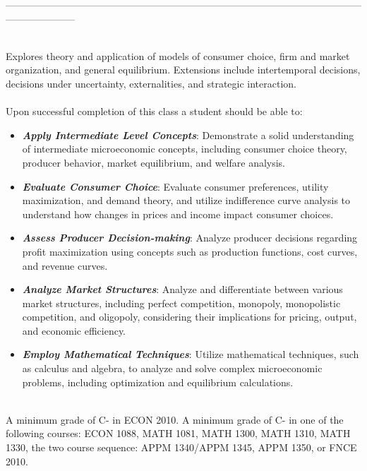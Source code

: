 \documentclass[11pt]{article}
\begin{document}
---------------------------------------------------------------------------------------------------------------------------------

\\
Explores theory and application of models of consumer choice, firm and market organization, and general equilibrium.  Extensions include intertemporal decisions, decisions under uncertainty, externalities, and strategic interaction.\\

\\
Upon successful completion of this class a student should be able to:
\begin{itemize}
\item {\bf\emph{Apply Intermediate Level Concepts}}:  Demonstrate a solid understanding of intermediate microeconomic concepts, including consumer choice theory, producer behavior, market equilibrium, and welfare analysis.\vspace{-.1in}
\item {\bf\emph{Evaluate Consumer Choice}}:  Evaluate consumer preferences, utility maximization, and demand theory, and utilize indifference curve analysis to understand how changes in prices and income impact consumer choices.\vspace{-.1in}
\item {\bf\emph{Assess Producer Decision-making}}:  Analyze producer decisions regarding profit maximization using concepts such as production functions, cost curves, and revenue curves.\vspace{-.1in}
\item {\bf\emph{Analyze Market Structures}}:  Analyze and differentiate between various market structures, including perfect competition, monopoly, monopolistic competition, and oligopoly, considering their implications for pricing, output, and economic efficiency.\vspace{-.1in} 
\item {\bf\emph{Employ Mathematical Techniques}}:  Utilize mathematical techniques, such as calculus and algebra, to analyze and solve complex microeconomic problems, including optimization and equilibrium calculations.
\end{itemize}

\\
A minimum grade of C- in ECON 2010.  A minimum grade of C- in one of the following courses: ECON 1088, MATH 1081, MATH 1300, MATH 1310, MATH 1330, the two course sequence: APPM 1340/APPM 1345, APPM 1350, or FNCE 2010.\\  
\end{document}
